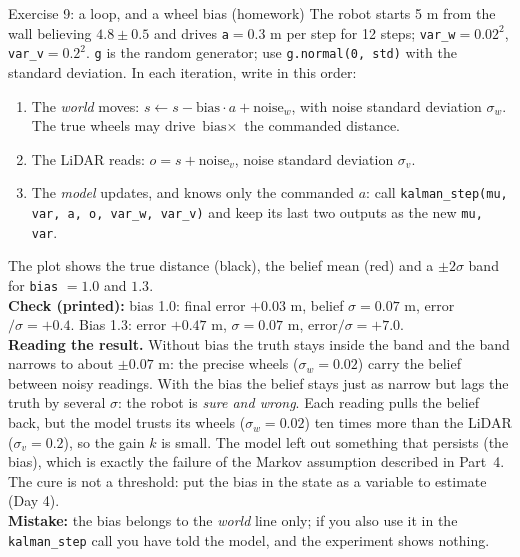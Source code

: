 \documentclass[11pt]{article}
\begin{document}
\begin{labhelp}{Exercise 9: a loop, and a wheel bias (homework)}
The robot starts 5 m from the wall believing $4.8\pm0.5$ and drives \texttt{a}$=0.3$ m per step for 12 steps; \texttt{var\_w}$=0.02^2$, \texttt{var\_v}$=0.2^2$. \texttt{g} is the random generator; use \texttt{g.normal(0, std)} with the standard deviation. In each iteration, write in this order:
\begin{enumerate}[nosep]
\item The \emph{world} moves: $s\leftarrow s-\text{bias}\cdot a+\text{noise}_w$, with noise standard deviation $\sigma_w$. The true wheels may drive $\text{bias}\times$ the commanded distance.
\item The LiDAR reads: $o=s+\text{noise}_v$, noise standard deviation $\sigma_v$.
\item The \emph{model} updates, and knows only the commanded $a$: call \texttt{kalman\_step(mu, var, a, o, var\_w, var\_v)} and keep its last two outputs as the new \texttt{mu, var}.
\end{enumerate}
The plot shows the true distance (black), the belief mean (red) and a $\pm2\sigma$ band for \texttt{bias} $=1.0$ and $1.3$.\\
\textbf{Check (printed):} bias 1.0: final error $+0.03$ m, belief $\sigma=0.07$ m, error$/\sigma=+0.4$. Bias 1.3: error $+0.47$ m, $\sigma=0.07$ m, error$/\sigma=+7.0$.\\
\textbf{Reading the result.} Without bias the truth stays inside the band and the band narrows to about $\pm0.07$ m: the precise wheels ($\sigma_w=0.02$) carry the belief between noisy readings. With the bias the belief stays just as narrow but lags the truth by several $\sigma$: the robot is \emph{sure and wrong}. Each reading pulls the belief back, but the model trusts its wheels ($\sigma_w=0.02$) ten times more than the LiDAR ($\sigma_v=0.2$), so the gain $k$ is small. The model left out something that persists (the bias), which is exactly the failure of the Markov assumption described in Part~4. The cure is not a threshold: put the bias in the state as a variable to estimate (Day 4).\\
\textbf{Mistake:} the bias belongs to the \emph{world} line only; if you also use it in the \texttt{kalman\_step} call you have told the model, and the experiment shows nothing.
\end{labhelp}

\end{document}
